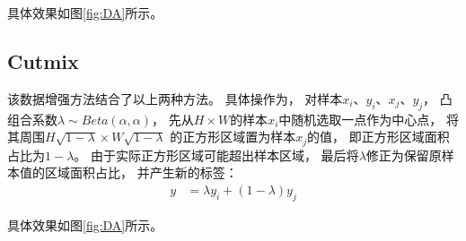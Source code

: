 \documentclass{article}
\begin{document}
具体效果如图\ref{fig:DA}所示。

\subsection{Cutmix}

该数据增强方法结合了以上两种方法。
具体操作为，
对样本$x_i$、$y_i$、$x_j$、$y_j$，
凸组合系数$\lambda \sim Beta(\alpha, \alpha)$，
先从$ H \times W$的样本$x_i$中随机选取一点作为中心点，
将其周围$ H \sqrt{1 - \lambda} \times W \sqrt{1 - \lambda}$
的正方形区域置为样本$x_j$的值，
即正方形区域面积占比为$ 1 - \lambda $。
由于实际正方形区域可能超出样本区域，
最后将$ \lambda $修正为保留原样本值的区域面积占比，
并产生新的标签：
\begin{align*}
y &= \lambda y_i + (1 - \lambda) y_j
\end{align*}

具体效果如图\ref{fig:DA}所示。
\end{document}
